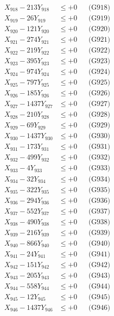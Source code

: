 \documentclass[a4paper,10pt]{article}
\begin{document}
{\begin{align}
X_{918} - 213Y_{918} &\leq +0 && \text{(G918)} \\
X_{919} - 26Y_{919} &\leq +0 && \text{(G919)} \\
X_{920} - 121Y_{920} &\leq +0 && \text{(G920)} \\
\allowbreak
X_{921} - 274Y_{921} &\leq +0 && \text{(G921)} \\
X_{922} - 219Y_{922} &\leq +0 && \text{(G922)} \\
X_{923} - 395Y_{923} &\leq +0 && \text{(G923)} \\
X_{924} - 974Y_{924} &\leq +0 && \text{(G924)} \\
X_{925} - 797Y_{925} &\leq +0 && \text{(G925)} \\
X_{926} - 185Y_{926} &\leq +0 && \text{(G926)} \\
X_{927} - 1437Y_{927} &\leq +0 && \text{(G927)} \\
X_{928} - 210Y_{928} &\leq +0 && \text{(G928)} \\
X_{929} - 69Y_{929} &\leq +0 && \text{(G929)} \\
X_{930} - 1437Y_{930} &\leq +0 && \text{(G930)} \\
\allowbreak
X_{931} - 173Y_{931} &\leq +0 && \text{(G931)} \\
X_{932} - 499Y_{932} &\leq +0 && \text{(G932)} \\
X_{933} - 4Y_{933} &\leq +0 && \text{(G933)} \\
X_{934} - 32Y_{934} &\leq +0 && \text{(G934)} \\
X_{935} - 322Y_{935} &\leq +0 && \text{(G935)} \\
X_{936} - 294Y_{936} &\leq +0 && \text{(G936)} \\
X_{937} - 552Y_{937} &\leq +0 && \text{(G937)} \\
X_{938} - 490Y_{938} &\leq +0 && \text{(G938)} \\
X_{939} - 216Y_{939} &\leq +0 && \text{(G939)} \\
X_{940} - 866Y_{940} &\leq +0 && \text{(G940)} \\
\allowbreak
X_{941} - 24Y_{941} &\leq +0 && \text{(G941)} \\
X_{942} - 151Y_{942} &\leq +0 && \text{(G942)} \\
X_{943} - 205Y_{943} &\leq +0 && \text{(G943)} \\
X_{944} - 558Y_{944} &\leq +0 && \text{(G944)} \\
X_{945} - 12Y_{945} &\leq +0 && \text{(G945)} \\
X_{946} - 1437Y_{946} &\leq +0 && \text{(G946)} \\

\end{align}}
\end{document}
